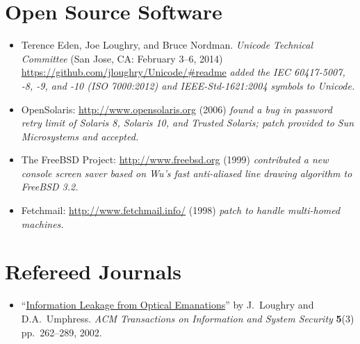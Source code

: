 \documentclass[12pt,twoside,letterpaper]{article}
\begin{document}
\vspace{-13mm}
\section*{Open Source Software}
\vspace{-2mm}
\begin{itemize}
	\item Terence Eden, Joe Loughry, and Bruce Nordman. \emph{Unicode
		Technical Committee} (San Jose, CA: February 3--6, 2014)
		\url{https://github.com/jloughry/Unicode/#readme} \emph{added
		the IEC 60417-5007, -8, -9, and -10 (ISO 7000:2012) and
		IEEE-Std-1621:2004 symbols to Unicode.}\vspace{-1mm}
	\item OpenSolaris: \url{http://www.opensolaris.org} (2006)
		\emph{found a bug in password retry limit of Solaris 8, Solaris 10,
		and Trusted Solaris; patch provided to Sun Microsystems and accepted.}\vspace{-1mm}
	\item The FreeBSD Project: \url{http://www.freebsd.org} (1999)
		\emph{contributed a new console screen saver based on Wu's fast
		anti-aliased line drawing algorithm to FreeBSD 3.2.}\vspace{-1mm}
	\item Fetchmail: \url{http://www.fetchmail.info/} (1998)
		\emph{patch to handle multi-homed machines.}
\end{itemize}

\vspace{-8mm}
\section*{Refereed Journals}
\vspace{-2mm}
\begin{itemize}
	\item ``\href{http://dl.acm.org/citation.cfm?doid=545186.545189}{Information
		Leakage from Optical Emanations}'' by J.\ Loughry and D.A.\ Umphress.
		\emph{ACM Transactions on Information and System Security} \textbf{5}(3)
		pp.\ 262--289, 2002.
\end{itemize}

\vspace{-8mm}
\end{document}
